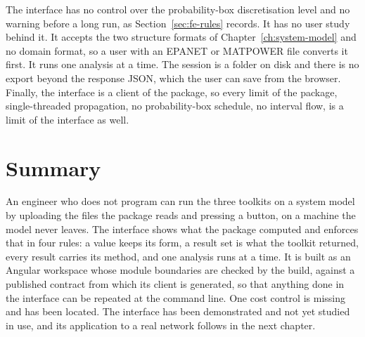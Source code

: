 \documentclass[12pt]{report}
\begin{document}
The interface has no control over the probability-box discretisation level and no warning
before a long run, as Section~\ref{sec:fe-rules} records. It has no user study behind it.
It accepts the two structure formats of Chapter~\ref{ch:system-model} and no domain format,
so a user with an EPANET or MATPOWER file converts it first. It runs one analysis at a
time. The session is a folder on disk and there is no export beyond the response JSON,
which the user can save from the browser. Finally, the interface is a client of the
package, so every limit of the package, single-threaded propagation, no probability-box
schedule, no interval flow, is a limit of the interface as well.

\section{Summary}
\label{sec:fe-summary}

An engineer who does not program can run the three toolkits on a system model by uploading
the files the package reads and pressing a button, on a machine the model never leaves. The
interface shows what the package computed and enforces that in four rules: a value keeps
its form, a result set is what the toolkit returned, every result carries its method, and
one analysis runs at a time. It is built as an Angular workspace whose module boundaries
are checked by the build, against a published contract from which its client is generated,
so that anything done in the interface can be repeated at the command line. One cost
control is missing and has been located. The interface has been demonstrated and not yet
studied in use, and its application to a real network follows in the next chapter.

\ifdefined\maindoc
\else
\printbibliography
\end{document}
